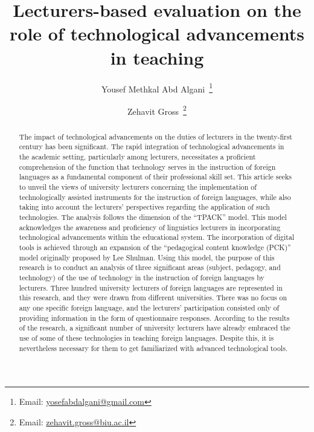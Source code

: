\documentclass[english]{textolivre}
\title{Lecturers-based evaluation on the role of technological advancements in teaching}
\author[1]{Yousef Methkal Abd Algani~\orcid{0000-0003-2801-5880}\thanks{Email: \href{yosefabdalgani@gmail.com}{yosefabdalgani@gmail.com}}}
\author[1]{Zehavit Gross~\orcid{0000-0002-8758-2036}\thanks{Email: \href{zehavit.gross@biu.ac.il}{zehavit.gross@biu.ac.il}}}
\affil[1]{Bar-Ilan University, Faculty of Education, Tel- Aviv, Israel.}
\begin{document}
\maketitle

\begin{polyabstract}
\begin{abstract}
The impact of technological advancements on the duties of lecturers in the twenty-first century has been significant. The rapid integration of technological advancements in the academic setting, particularly among lecturers, necessitates a proficient comprehension of the function that technology serves in the instruction of foreign languages as a fundamental component of their professional skill set. This article seeks to unveil the views of university lecturers concerning the implementation of technologically assisted instruments for the instruction of foreign languages, while also taking into account the lecturers’ perspectives regarding the application of such technologies. The analysis follows the dimension of the “TPACK” model. This model acknowledges the awareness and proficiency of linguistics lecturers in incorporating technological advancements within the educational system. The incorporation of digital tools is achieved through an expansion of the “pedagogical content knowledge (PCK)” model originally proposed by Lee Shulman. Using this model, the purpose of this research is to conduct an analysis of three significant areas (subject, pedagogy, and technology) of the use of technology in the instruction of foreign languages by lecturers. Three hundred university lecturers of foreign languages are represented in this research, and they were drawn from different universities. There was no focus on any one specific foreign language, and the lecturers’ participation consisted only of providing information in the form of questionnaire responses. According to the results of the research, a significant number of university lecturers have already embraced the use of some of these technologies in teaching foreign languages. Despite this, it is nevertheless necessary for them to get familiarized with advanced technological tools. 

\end{abstract}


\end{polyabstract}
\end{document}
